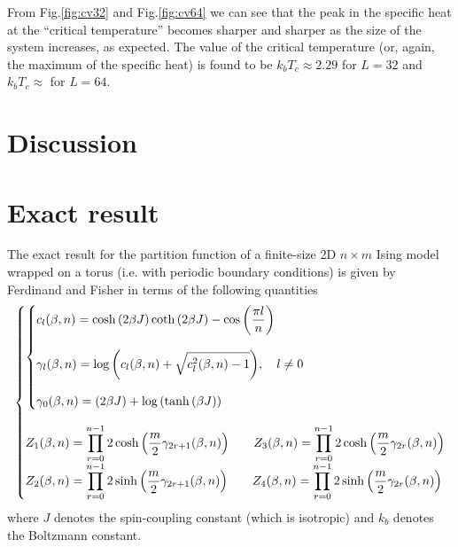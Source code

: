 \documentclass[11pt]{article}
\makeatletter
\newcommand{\figname}{Fig.}
\newenvironment{system}
		{\left\lbrace\begin{array}{@{}l@{}}}
		{\end{array}\right.}
\makeatother
\begin{document}
From \figname \ref{fig:cv32} and \figname \ref{fig:cv64} we can see that the peak in the specific heat at the ``critical temperature'' becomes sharper and sharper as the size of the system increases, as expected. The value of the critical temperature (or, again, the maximum of the specific heat) is found to be $k_bT_c \approx 2.29$ for $L=32$ and $k_bT_c \approx $ for $L=64$.

\section*{Discussion}

\appendix

\section{Exact result}
\label{app:exact_result}

The exact result for the partition function of a finite-size 2D $n \times m$ Ising model wrapped on a torus (i.e. with periodic boundary conditions) is given by Ferdinand and Fisher in terms of the following quantities
\[
\begin{system}
	\begin{system}
		\displaystyle	
		c_l(\beta,n) =	
					\cosh{(2\beta J)}\coth{(2\beta J)} -
					\cos{\left(\frac{\pi l}{n}\right)} 								\\
		\\
		\displaystyle
		\gamma_l(\beta,n) = 
					\log{\left(c_l(\beta,n) +
					\sqrt{c_l^2(\beta,n) - 1}\right)}, \quad l \neq 0	\\
		\\
		\displaystyle
		\gamma_0(\beta,n) = (2\beta J) + \log{(\tanh{(\beta J)})}
	\end{system}\\
	\\
\displaystyle 
	Z_1(\beta,n) = \prod_{r=0}^{n-1}
				2\cosh{\left(\frac{m}{2}\gamma_{2r+1}(\beta,n)\right)} 	\qquad
	Z_3(\beta,n) = \prod_{r=0}^{n-1}
				2\cosh{\left(\frac{m}{2}\gamma_{2r}(\beta,n)\right)} 	\\
\displaystyle
	Z_2(\beta,n) = \prod_{r=0}^{n-1}
				2\sinh{\left(\frac{m}{2}\gamma_{2r+1}(\beta,n)\right)}	\qquad
	Z_4(\beta,n) = \prod_{r=0}^{n-1}
				2\sinh{\left(\frac{m}{2}\gamma_{2r}(\beta,n)\right)}	\\
\end{system}
\]
where $J$ denotes the spin-coupling constant (which is isotropic) and $k_b$ denotes the Boltzmann constant.
\end{document}
